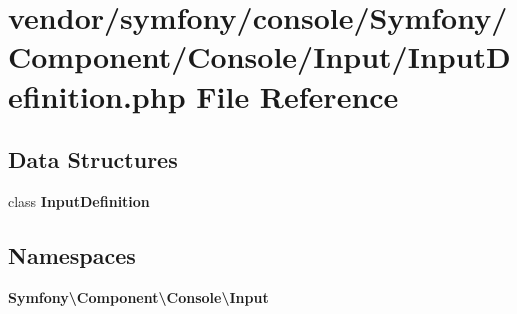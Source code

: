 \section{vendor/symfony/console/\+Symfony/\+Component/\+Console/\+Input/\+Input\+Definition.php File Reference}
\label{_input_definition_8php}
\subsection*{Data Structures}
\begin{DoxyCompactItemize}
\item 
class {\bf Input\+Definition}
\end{DoxyCompactItemize}
\subsection*{Namespaces}
\begin{DoxyCompactItemize}
\item 
 {\bf Symfony\textbackslash{}\+Component\textbackslash{}\+Console\textbackslash{}\+Input}
\end{DoxyCompactItemize}
